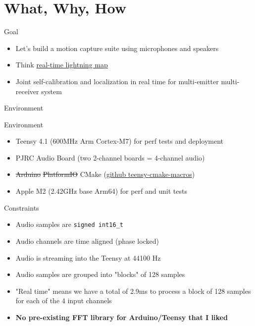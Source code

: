 

\section{What, Why, How}

\begin{frame}{Goal}
	\begin{itemize}
		\item Let's build a motion capture suite using microphones and speakers
		\item Think \href{https://www.lightningmaps.org/\#m=ses;t=3;s=0;o=0;b=;ts=0;z=5;y=35.9448;x=-87.045;d=2;dl=2;dc=0;}{real-time lightning map}
		\item Joint self-calibration and localization in real time for multi-emitter multi-receiver system
	\end{itemize}
\end{frame}

\begin{frame}{Environment}
	\begin{block}{Environment}
		\begin{itemize}
			\item Teensy 4.1 (600MHz Arm Cortex-M7) for perf tests and deployment
			\item PJRC Audio Board (two 2-channel boards = 4-channel audio)
			\item \sout{Arduino} \sout{PlatformIO} CMake (\href{https://github.com/newdigate/teensy-cmake-macros}{github teensy-cmake-macros})
			\item Apple M2 (2.42GHz base Arm64) for perf and unit tests
		\end{itemize}
	\end{block}
	
	\begin{block}{Constraints}
		\begin{itemize}
			\item Audio samples are \texttt{signed int16\_t}
			\item Audio channels are time aligned (phase locked)
			\item Audio is streaming into the Teensy at 44100 Hz
			\item Audio samples are grouped into "blocks" of 128 samples
			\item "Real time" means we have a total of 2.9ms to process a block of 128 samples for each of the 4 input channels
			\item \textbf{No pre-existing FFT library for Arduino/Teensy that I liked}
		\end{itemize}
	\end{block}
\end{frame}


